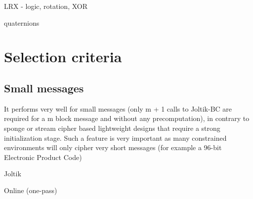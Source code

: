 LRX - logic, rotation, XOR

quaternions

\section{Selection criteria}

\subsection{Small messages}

It performs very well for small messages (only m + 1 calls to Joltik-BC are required for a m
block message and without any precomputation), in contrary to sponge or stream cipher based
lightweight designs that require a strong initialization stage. Such a feature is very important
as many constrained environments will only cipher very short messages (for example a 96-bit
Electronic Product Code)

Joltik

\begin{description}
  \item[Online (one-pass)]
\end{description}






